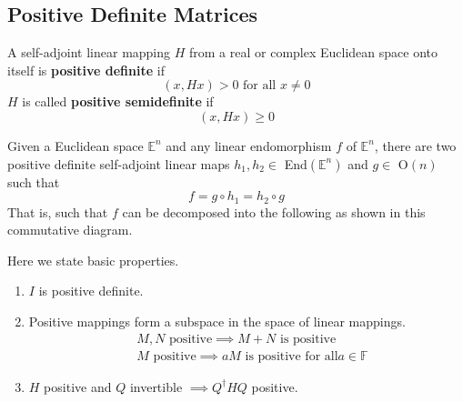 \subsection{Positive Definite Matrices}

  \begin{definition}
    A self-adjoint linear mapping $H$ from a real or complex Euclidean space onto itself is \textbf{positive definite} if 
    \begin{equation}
      (x, H x) > 0 \text{ for all } x \neq 0
    \end{equation}
    $H$ is called \textbf{positive semidefinite} if 
    \begin{equation}
      (x, H x) \geq 0
    \end{equation}
  \end{definition}

  \begin{theorem}
    Given a Euclidean space $\mathbb{E}^n$ and any linear endomorphism $f$ of $\mathbb{E}^n$, there are two positive definite self-adjoint linear maps $h_1, h_2 \in$ End$(\mathbb{E}^n)$ and $g \in$ O$(n)$ such that
    \begin{equation}
      f = g \circ h_1 = h_2 \circ g
    \end{equation}
    That is, such that $f$ can be decomposed into the following as shown in this commutative diagram. 
  \end{theorem}

  \begin{theorem} 
    Here we state basic properties. 
    \begin{enumerate}
      \item $I$ is positive definite. 
      \item Positive mappings form a subspace in the space of linear mappings. 
      \begin{align*}
        &M, N \text{ positive} \implies M + N \text{ is positive} \\
        &M \text{ positive} \implies a M \text{ is positive for all} a \in \mathbb{F}
      \end{align*}
      \item $H$ positive and $Q$ invertible $\implies Q^\dagger H Q$ positive. 
    \end{enumerate}
  \end{theorem}

